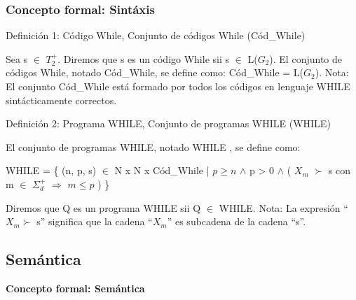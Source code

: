 \documentclass[xcolor=table]{beamer}
\begin{document}
\begin{frame}[fragile]\frametitle{Concepto formal: Sintáxis} \small  

\begin{block}{Definición 1: Código While, Conjunto de códigos While (Cód\_While)}
\end{block}
Sea s $\in$ $T^+_2$. Diremos que s es un código While sii s $\in$ L($G_2$).\break
\vspace{0.2cm}
El conjunto de códigos While, notado Cód\_While, se define como: Cód\_While = L($G_2$).\hfill \break
\scriptsize
Nota: El conjunto Cód\_While está formado por todos los códigos en lenguaje WHILE sintácticamente correctos.\small


\begin{block}{Definición 2: Programa WHILE, Conjunto de programas WHILE (WHILE)}
\end{block}
El conjunto de programas WHILE, notado WHILE , se define como:
\begin{center}
WHILE = \{ (n, p, s) $\in$ N x N x Cód\_While | $p \geq n$ $\wedge$ p > 0 $\wedge$ ( $X_m$ $\succ$ s con m $\in$ $\Sigma^+_d$ $\Rightarrow$  $m \leq  p$ ) \} 
\end{center}

Diremos que Q es un programa WHILE sii Q $\in$ WHILE.
\hfill \break
\scriptsize
Nota: La expresión ``$X_m \succ$ s” significa que la cadena ``$X_m$'' es subcadena de la cadena ``s''. 

\end{frame}


\subsection{Semántica}

\begin{frame}  \Large

\begin{center}
    \textbf{Concepto formal: Semántica}
\end{center}

\end{frame} 
\end{document}
